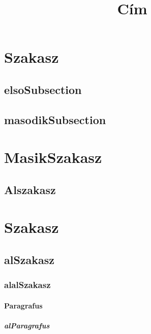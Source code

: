 \documentclass[10pt]{article}
\begin{document}
	\title{Cím}
	\maketitle
		\tableofcontents
	\clearpage
	\section{Szakasz}
		\subsection{elsoSubsection}
			\lipsum[1-3]
		\subsection{masodikSubsection}
			\lipsum[1-3]	
	\section{MasikSzakasz}
		\subsection{Alszakasz}
		
		\section{Szakasz}
			\subsection{alSzakasz}
				\subsubsection{alalSzakasz}
					\paragraph{Paragrafus}
						\subparagraph{alParagrafus}
\end{document}
